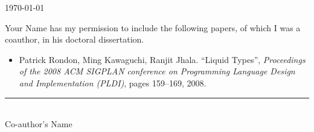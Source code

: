 \documentclass{article}
\begin{document}
\today

\bigskip
\bigskip
\bigskip

Your Name has my permission to include the following papers, of
which I was a coauthor, in his doctoral dissertation.

\begin{itemize}

\item Patrick Rondon, Ming Kawaguchi, Ranjit Jhala. ``Liquid Types'',
\emph{Proceedings of the 2008
ACM SIGPLAN conference on Programming Language Design and Implementation
(PLDI)}, pages 159--169, 2008.

\end{itemize}

\bigskip
\bigskip
\bigskip

\noindent
\rule{5cm}{1pt} \\
Co-author's Name
\end{document}

